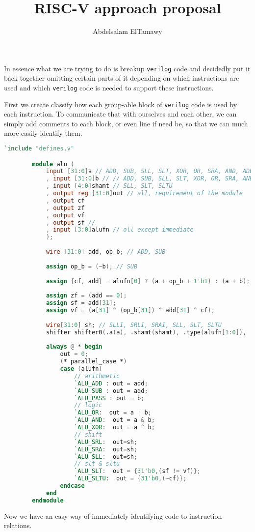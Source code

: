 \documentclass[]{article}
\title{RISC-V approach proposal}
\author{Abdelsalam ElTamawy}
\begin{document}

	In essence what we are trying to do is breakup \verb|verilog| code and decidedly put it back together omitting certain parts of it depending on which instructions are used and which \verb|verilog| code is needed to support these instructions.

	First we create classify how each group-able block of \verb|verilog| code is used by each instruction. To communicate that with ourselves and each other, we can simply add comments to each block, or even line if need be, so that we can much more easily identify them.

	\begin{lstlisting}[language=verilog, caption=an example of an annotated file]
		`include "defines.v"

		module alu (
			input [31:0]a // ADD, SUB, SLL, SLT, XOR, OR, SRA, AND, ADDI, SLTI, SLTIU, XORI, ORI, ANDI, SLLI, SRLI, SRLI, SRAI
			, input [31:0]b // // ADD, SUB, SLL, SLT, XOR, OR, SRA, AND, ADDI, SLTI, SLTIU, XORI, ORI, ANDI, SLLI, SRLI, SRLI, SRAI
			, input [4:0]shamt // SLL, SLT, SLTU
			, output reg [31:0]out // all, requirement of the module
			, output cf 
			, output zf 
			, output vf 
			, output sf // 
			, input [3:0]alufn // all except immediate
			);
		
			wire [31:0] add, op_b; // ADD, SUB
			
			assign op_b = (~b); // SUB
			
			assign {cf, add} = alufn[0] ? (a + op_b + 1'b1) : (a + b); // ADD, SUB
			
			assign zf = (add == 0);
			assign sf = add[31];
			assign vf = (a[31] ^ (op_b[31]) ^ add[31] ^ cf);
			
			wire[31:0] sh; // SLLI, SRLI, SRAI, SLL, SLT, SLTU
			shifter shifter0(.a(a), .shamt(shamt), .type(alufn[1:0]),  .r(sh)); // SLLI, SRLI, SRAI, SLL, SLT, SLTU
			
			always @ * begin
				out = 0;
				(* parallel_case *)
				case (alufn)
					// arithmetic
					`ALU_ADD : out = add;
					`ALU_SUB : out = add;
					`ALU_PASS : out = b;
					// logic
					`ALU_OR:  out = a | b;
					`ALU_AND:  out = a & b;
					`ALU_XOR:  out = a ^ b;
					// shift
					`ALU_SRL:  out=sh;
					`ALU_SRA:  out=sh;
					`ALU_SLL:  out=sh;
					// slt & sltu
					`ALU_SLT:  out = {31'b0,(sf != vf)};
					`ALU_SLTU:  out = {31'b0,(~cf)};
				endcase
			end
		endmodule
	\end{lstlisting}

	Now we have an easy way of immediately identifying code to instruction relations.

	
\end{document}
